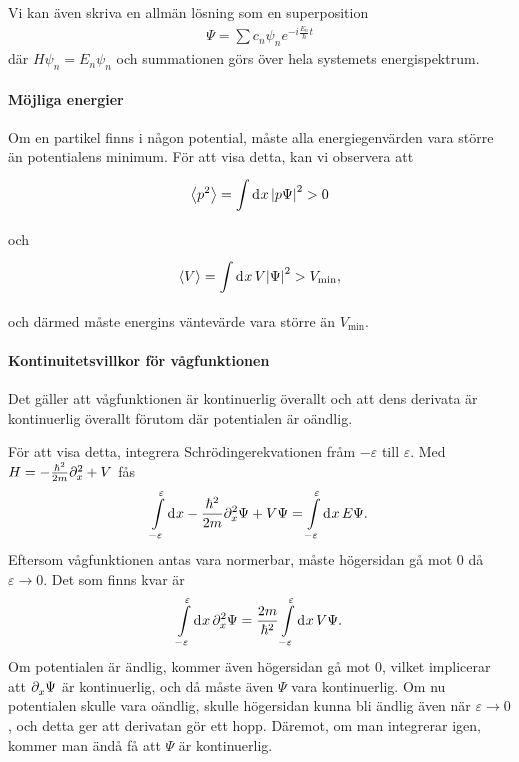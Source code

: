 Vi kan även skriva en allmän lösning som en superposition
\begin{align*}
	\Psi = \sum c_{n}\psi_{n}e^{-i\frac{E_{n}}{\hbar}t}
\end{align*}
där $H\psi_{n} = E_{n}\psi_{n}$ och summationen görs över hela systemets energispektrum.

\paragraph{Möjliga energier}
Om en partikel finns i någon potential, måste alla energiegenvärden vara större än potentialens minimum. För att visa detta, kan vi observera att
\begin{align*}
	\expval{p^{2}} = \integ{}{}{x}{\abs{p\Psi}^{2}} > 0
\end{align*}
och
\begin{align*}
	\expval{V} = \integ{}{}{x}{V\abs{\Psi}^{2}} > V_\text{min},
\end{align*}
och därmed måste energins väntevärde vara större än $V_\text{min}$.

\paragraph{Kontinuitetsvillkor för vågfunktionen}
Det gäller att vågfunktionen är kontinuerlig överallt och att dens derivata är kontinuerlig överallt förutom där potentialen är oändlig.

För att visa detta, integrera Schrödingerekvationen fråm $-\varepsilon$ till $\varepsilon$. Med $H = -\frac{\hbar^{2}}{2m}\del[2]{x}{} + V$ fås
\begin{align*}
	\integ{-\varepsilon}{\varepsilon}{x}{-\frac{\hbar^{2}}{2m}\del[2]{x}{\Psi} + V\Psi} = \integ{-\varepsilon}{\varepsilon}{x}{E\Psi}.
\end{align*}
Eftersom vågfunktionen antas vara normerbar, måste högersidan gå mot $0$ då $\varepsilon\to 0$. Det som finns kvar är
\begin{align*}
	\integ{-\varepsilon}{\varepsilon}{x}{\del[2]{x}{\Psi}} = \frac{2m}{\hbar^{2}}\integ{-\varepsilon}{\varepsilon}{x}{V\Psi}.
\end{align*}
Om potentialen är ändlig, kommer även högersidan gå mot $0$, vilket implicerar att $\del{x}{\Psi}$ är kontinuerlig, och då måste även $\Psi$ vara kontinuerlig. Om nu potentialen skulle vara oändlig, skulle högersidan kunna bli ändlig även när $\varepsilon\to 0$, och detta ger att derivatan gör ett hopp. Däremot, om man integrerar igen, kommer man ändå få att $\Psi$ är kontinuerlig.

